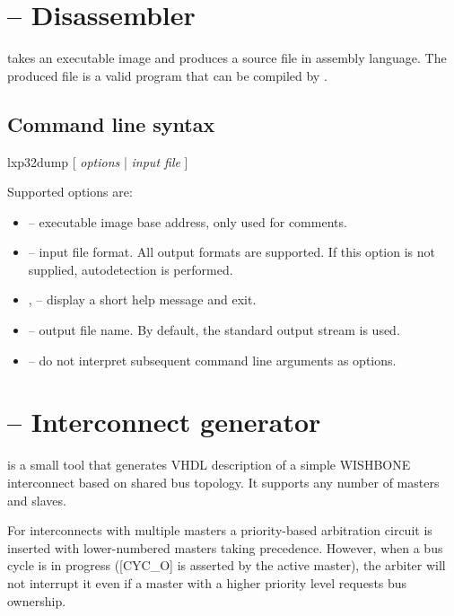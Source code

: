 \documentclass[a4paper,12pt,twoside,extrafontsizes]{memoir}
\begin{document}
\section{ -- Disassembler}

 takes an executable image and produces a source file in \lxp{} assembly language. The produced file is a valid program that can be compiled by .

\subsection{Command line syntax}

\begin{codepar}
    lxp32dump [ \emph{options} | \emph{input file} ]
\end{codepar}

Supported options are:

\begin{itemize}
	\item {} -- executable image base address, only used for comments.
	
	\item {} -- input file format. All  output formats are supported. If this option is not supplied, autodetection is performed.
	
	\item {},  -- display a short help message and exit.
	
	\item {} -- output file name. By default, the standard output stream is used.
	
	\item \shellcmd{--} -- do not interpret subsequent command line arguments as options.
\end{itemize}

\section{ -- Interconnect generator}

 is a small tool that generates VHDL description of a simple WISHBONE interconnect based on shared bus topology. It supports any number of masters and slaves.

For interconnects with multiple masters a priority-based arbitration circuit is inserted with lower-numbered masters taking precedence. However, when a bus cycle is in progress ([CYC\_O] is asserted by the active master), the arbiter will not interrupt it even if a master with a higher priority level requests bus ownership.
\end{document}
